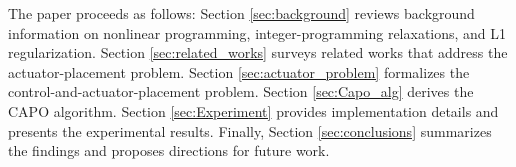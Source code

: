 \documentclass[runningheads]{llncs}
\begin{document}
The paper proceeds as follows: Section \ref{sec:background} reviews background information on nonlinear programming, integer-programming relaxations, and L1 regularization. Section \ref{sec:related_works} surveys related works that address the actuator-placement problem. Section \ref{sec:actuator_problem} formalizes the control-and-actuator-placement problem. Section \ref{sec:Capo_alg} derives the CAPO algorithm. Section \ref{sec:Experiment} provides implementation details and presents the experimental results. Finally, Section \ref{sec:conclusions} summarizes the findings and proposes directions for future work.

\end{document}
